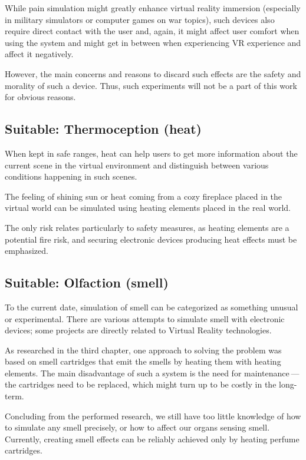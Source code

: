 While pain simulation might greatly enhance virtual reality immersion
(especially in military simulators or computer games on war topics),
such devices also require direct contact with the user and, again,
it might affect user comfort when using the system and might get in between
when experiencing VR experience and affect it negatively.


However, the main concerns and reasons to discard such effects are the
safety and morality of such a device. Thus, such experiments will not be
a part of this work for obvious reasons.


\hypertarget{x-suitable:-thermoception-(heat)}{\subsection{Suitable: Thermoception (heat)}}
When kept in safe ranges, heat can help users to get more information about the
current scene in the virtual environment and distinguish between various conditions
happening in such scenes.


The feeling of shining sun or heat coming from a cozy fireplace placed in the
virtual world can be simulated using heating elements placed in the real world.


The only risk relates particularly to safety measures, as heating elements are
a potential fire risk, and securing electronic devices producing heat effects
must be emphasized.


\hypertarget{x-suitable:-olfaction-(smell)}{\subsection{Suitable: Olfaction (smell)}}
To the current date, simulation of smell can be categorized as something unusual
or experimental. There are various attempts to simulate smell with electronic
devices; some projects are directly related to Virtual Reality technologies.


As researched in the third chapter,
one approach to solving the problem was based on smell
cartridges that emit the smells by heating them with heating elements.
The main disadvantage of such a system is the need for maintenance — the
cartridges need to be replaced, which might turn up to be costly in the
long-term.


Concluding from the performed research, we still have too little
knowledge of how to simulate any smell precisely, or how to affect our organs
sensing smell. Currently, creating smell effects can be reliably achieved
only by heating perfume cartridges.


